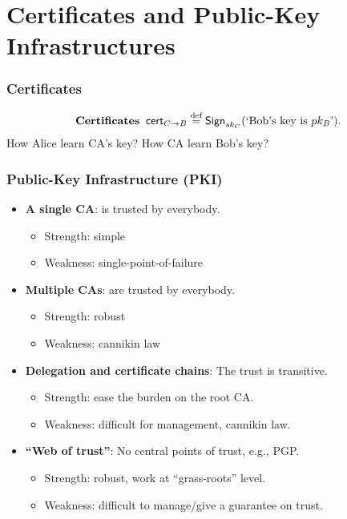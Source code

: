 \section{Certificates and Public-Key Infrastructures}
\begin{frame}\frametitle{Certificates}
\begin{figure}
\begin{center}

\end{center}
\end{figure}
\[\text{\bf Certificates}\;\; \mathsf{cert}_{C\to B} \overset{\text{def}}{=} \mathsf{Sign}_{sk_C}(\text{`Bob's key is } pk_B\text{'}).\]
\alert{How Alice learn CA's key? How CA learn Bob's key?}
\end{frame}
\begin{frame}\frametitle{Public-Key Infrastructure (PKI)}
\begin{itemize}
\item \textbf{A single CA}: is trusted by everybody.
\begin{itemize}
\item Strength: simple
\item Weakness: single-point-of-failure
\end{itemize}
\item \textbf{Multiple CAs}: are trusted by everybody.
\begin{itemize}
\item Strength: robust
\item Weakness: cannikin law
\end{itemize}
\item \textbf{Delegation and certificate chains}: The trust is transitive.
\begin{itemize}
\item Strength: ease the burden on the root CA. 
\item Weakness: difficult for management, cannikin law. 
\end{itemize}
\item \textbf{``Web of trust''}: No central points of trust, e.g., PGP.
\begin{itemize}
\item Strength: robust, work at ``grass-roots'' level. 
\item Weakness: difficult to manage/give a guarantee on trust.
\end{itemize}
\end{itemize}
\end{frame}
